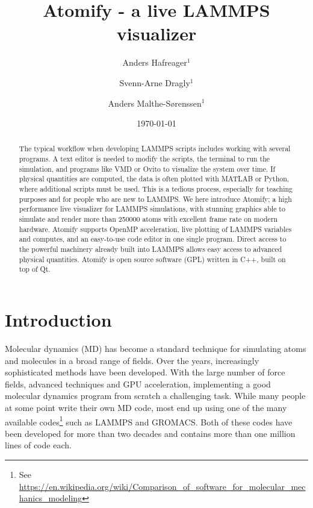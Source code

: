 \documentclass[aps,pre,twocolumn,letterpaper,floatfix]{revtex4}
\begin{document}
\title{Atomify - a live LAMMPS visualizer}
\author{Anders Hafreager$^1$}
\author{Svenn-Arne Dragly$^{1}$} 
\author{Anders Malthe-S\o renssen$^1$}
\date{\today} 

\begin{abstract} 
The typical workflow when developing LAMMPS scripts includes working with several programs. A text editor is needed to modify the scripts, the terminal to run the simulation, and programs like VMD or Ovito to visualize the system over time. If physical quantities are computed, the data is often plotted with MATLAB or Python, where additional scripts must be used. This is a tedious process, especially for teaching purposes and for people who are new to LAMMPS. 
We here introduce Atomify; a high performance live visualizer for LAMMPS simulations, with stunning graphics able to simulate and render more than 250000 atoms with excellent frame rate on modern hardware. Atomify supports OpenMP acceleration, live plotting of LAMMPS variables and computes, and an easy-to-use code editor in one single program. Direct access to the powerful machinery already built into LAMMPS allows easy access to advanced physical quantities. Atomify is open source software (GPL) written in C++, built on top of Qt. 
\end{abstract} 
 
\maketitle
 
\section{Introduction}
Molecular dynamics (MD) has become a standard technique for simulating atoms and molecules in a broad range of fields. Over the years, increasingly sophisticated methods have been developed. With the large number of force fields, advanced techniques and GPU acceleration, implementing a good molecular dynamics program from scratch a challenging task. While many people at some point write their own MD code, most end up using one of the many available codes\footnote{See \url{https://en.wikipedia.org/wiki/Comparison_of_software_for_molecular_mechanics_modeling}} such as LAMMPS\cite{plimpton1995fast} and GROMACS\cite{Pronk2013}. Both of these codes have been developed for more than two decades and contains more than one million lines of code each. 
\end{document}
